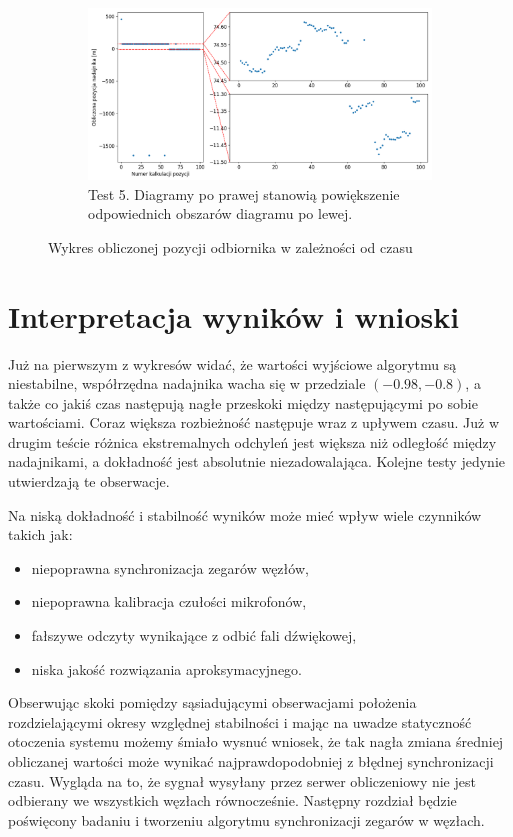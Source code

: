 \begin{figure}[H]
    \ContinuedFloat\centering
    \begin{subfigure}{\textwidth}\label{fig:position_4}
        \centering
        \includegraphics[width=\linewidth]{pics/position/position_4.png}
        \caption{Test 5. Diagramy po prawej stanowią powiększenie odpowiednich obszarów diagramu po lewej.}
    \end{subfigure}
    \caption{Wykres obliczonej pozycji odbiornika w zależności od czasu}
    \label{fig:position}
\end{figure}

\section{Interpretacja wyników i wnioski}

Już na pierwszym z wykresów widać, że wartości wyjściowe algorytmu są niestabilne, współrzędna nadajnika wacha się w przedziale $(-0.98, -0.8)$, a także co jakiś czas następują nagłe przeskoki między następującymi po sobie wartościami. Coraz większa rozbieżność następuje wraz z upływem czasu. Już w drugim teście różnica ekstremalnych odchyleń jest większa niż odległość między nadajnikami, a dokładność jest absolutnie niezadowalająca. Kolejne testy jedynie utwierdzają te obserwacje.

Na niską dokładność i stabilność wyników może mieć wpływ wiele czynników takich jak:

\begin{itemize}
    \item niepoprawna synchronizacja zegarów węzłów,
    \item niepoprawna kalibracja czułości mikrofonów,
    \item fałszywe odczyty wynikające z odbić fali dźwiękowej,
    \item niska jakość rozwiązania aproksymacyjnego.
\end{itemize}

Obserwując skoki pomiędzy sąsiadującymi obserwacjami położenia rozdzielającymi okresy względnej stabilności i mając na uwadze statyczność otoczenia systemu możemy śmiało wysnuć wniosek, że tak nagła zmiana średniej obliczanej wartości może wynikać najprawdopodobniej z błędnej synchronizacji czasu. Wygląda na to, że sygnał wysyłany przez serwer obliczeniowy nie jest odbierany we wszystkich węzłach równocześnie. Następny rozdział będzie poświęcony badaniu i tworzeniu algorytmu synchronizacji zegarów w węzłach.
